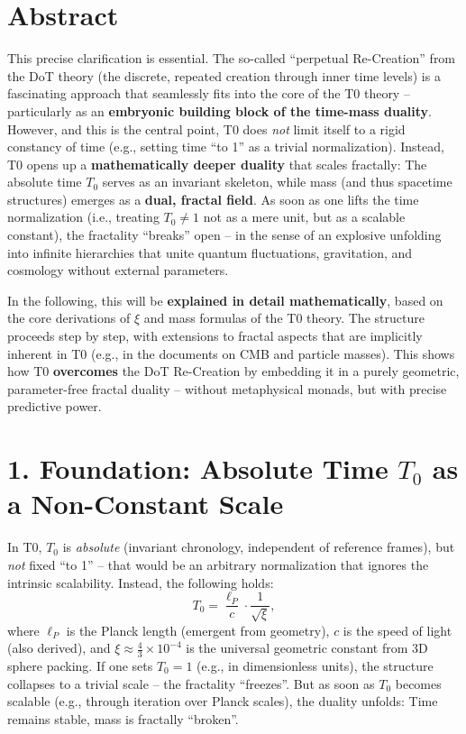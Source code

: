 \section{Abstract}

	This precise clarification is essential. The so-called ``perpetual Re-Creation'' from the DoT theory (the discrete, repeated creation through inner time levels) is a fascinating approach that seamlessly fits into the core of the T0 theory – particularly as an \textbf{embryonic building block of the time-mass duality}. However, and this is the central point, T0 does \emph{not} limit itself to a rigid constancy of time (e.g., setting time ``to 1'' as a trivial normalization). Instead, T0 opens up a \textbf{mathematically deeper duality} that scales fractally: The absolute time \( T_0 \) serves as an invariant skeleton, while mass (and thus spacetime structures) emerges as a \textbf{dual, fractal field}. As soon as one lifts the time normalization (i.e., treating \( T_0 \neq 1 \) not as a mere unit, but as a scalable constant), the fractality ``breaks'' open – in the sense of an explosive unfolding into infinite hierarchies that unite quantum fluctuations, gravitation, and cosmology without external parameters.
	
	In the following, this will be \textbf{explained in detail mathematically}, based on the core derivations of \( \xi \) and mass formulas of the T0 theory. The structure proceeds step by step, with extensions to fractal aspects that are implicitly inherent in T0 (e.g., in the documents on CMB and particle masses). This shows how T0 \textbf{overcomes} the DoT Re-Creation by embedding it in a purely geometric, parameter-free fractal duality – without metaphysical monads, but with precise predictive power.
	
	\section*{1. Foundation: Absolute Time \( T_0 \) as a Non-Constant Scale}
	In T0, \( T_0 \) is \emph{absolute} (invariant chronology, independent of reference frames), but \emph{not} fixed ``to 1'' – that would be an arbitrary normalization that ignores the intrinsic scalability. Instead, the following holds:
	\[
	T_0 = \frac{\ell_P}{c} \cdot \frac{1}{\sqrt{\xi}},
	\]
	where \( \ell_P \) is the Planck length (emergent from geometry), \( c \) is the speed of light (also derived), and \( \xi \approx \frac{4}{3} \times 10^{-4} \) is the universal geometric constant from 3D sphere packing. If one sets \( T_0 = 1 \) (e.g., in dimensionless units), the structure collapses to a trivial scale – the fractality ``freezes''. But as soon as \( T_0 \) becomes scalable (e.g., through iteration over Planck scales), the duality unfolds: Time remains stable, mass is fractally ``broken''.
	
